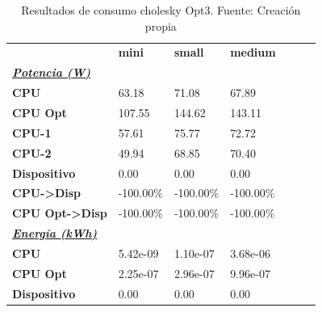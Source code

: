 \begin{table}[H]
    \centering
    \begin{tabular}{lllllll}
    \rowcolor[HTML]{DAE8FC} \ & \textbf{mini} & \textbf{	small} & \textbf{	medium} \\
    \cellcolor[HTML]{DAE8FC} \textbf{\textbf{{\emph{{\underline{{Potencia (W)}}}}}}} &  & 	 & 	 \\
    \rowcolor[HTML]{EFEFEF} \cellcolor[HTML]{DAE8FC} \textbf{CPU} & 63.18 & 	71.08 & 	67.89 \\
    \cellcolor[HTML]{DAE8FC} \textbf{CPU Opt} & 107.55 & 	144.62 & 	143.11 \\
    \rowcolor[HTML]{EFEFEF} \cellcolor[HTML]{DAE8FC} \textbf{\quad CPU-1} & 57.61 & 	75.77 & 	72.72 \\
    \cellcolor[HTML]{DAE8FC} \textbf{\quad CPU-2} & 49.94 & 	68.85 & 	70.40 \\
    \rowcolor[HTML]{EFEFEF} \cellcolor[HTML]{DAE8FC} \textbf{Dispositivo} & 0.00 & 	0.00 & 	0.00 \\
    \cellcolor[HTML]{DAE8FC} \textbf{CPU->Disp} & -100.00\% & 	-100.00\% & 	-100.00\% \\
    \rowcolor[HTML]{EFEFEF} \cellcolor[HTML]{DAE8FC} \textbf{CPU Opt->Disp} & -100.00\% & 	-100.00\% & 	-100.00\% \\
    \cellcolor[HTML]{DAE8FC} \textbf{\textbf{{\emph{{\underline{{Energía (kWh)}}}}}}} &  & 	 & 	 \\
    \rowcolor[HTML]{EFEFEF} \cellcolor[HTML]{DAE8FC} \textbf{CPU} & 5.42e-09 & 	1.10e-07 & 	3.68e-06 \\
    \cellcolor[HTML]{DAE8FC} \textbf{CPU Opt} & 2.25e-07 & 	2.96e-07 & 	9.96e-07 \\
    \rowcolor[HTML]{EFEFEF} \cellcolor[HTML]{DAE8FC} \textbf{Dispositivo} & 0.00 & 	0.00 & 	0.00 \\
    \end{tabular}
    \caption[Resultados de consumo cholesky Opt3]{{Resultados de consumo cholesky Opt3. Fuente: Creación propia}}
    \label{table_test_cholesky_Opt3_hw_powerResults}
\end{table}